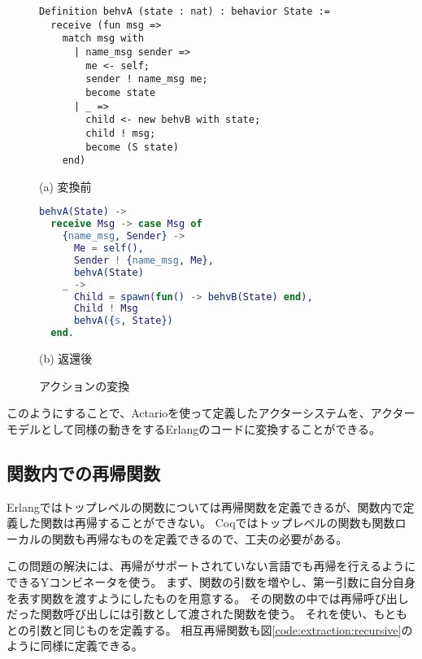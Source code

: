 \begin{figure}\centering
\begin{minipage}{1\textwidth}\centering
\begin{lstlisting}[frame=single,numbers=none,xleftmargin=0pt]
Definition behvA (state : nat) : behavior State :=
  receive (fun msg =>
    match msg with
      | name_msg sender =>
        me <- self;
        sender ! name_msg me;
        become state
      | _ =>
        child <- new behvB with state;
        child ! msg;
        become (S state)
    end)
\end{lstlisting}
(a) 変換前
\end{minipage}
\begin{minipage}{1\textwidth}\centering
\begin{lstlisting}[frame=single,numbers=none,xleftmargin=0pt,language=Erlang]
behvA(State) ->
  receive Msg -> case Msg of
    {name_msg, Sender} ->
      Me = self(),
      Sender ! {name_msg, Me},
      behvA(State)
    _ ->
      Child = spawn(fun() -> behvB(State) end),
      Child ! Msg
      behvA({s, State})
  end.
\end{lstlisting}
(b) 返還後
\end{minipage}
\label{code:extraction:action}
\caption{アクションの変換}
\end{figure}

このようにすることで、Actarioを使って定義したアクターシステムを、アクターモデルとして同様の動きをするErlangのコードに変換することができる。

\subsection{関数内での再帰関数}

Erlangではトップレベルの関数については再帰関数を定義できるが、関数内で定義した関数は再帰することができない。
Coqではトップレベルの関数も関数ローカルの関数も再帰なものを定義できるので、工夫の必要がある。

この問題の解決には、再帰がサポートされていない言語でも再帰を行えるようにできるYコンビネータを使う。
まず、関数の引数を増やし、第一引数に自分自身を表す関数を渡すようにしたものを用意する。
その関数の中では再帰呼び出しだった関数呼び出しには引数として渡された関数を使う。
それを使い、もともとの引数と同じものを定義する。
相互再帰関数も図\ref{code:extraction:recursive}のように同様に定義できる。

